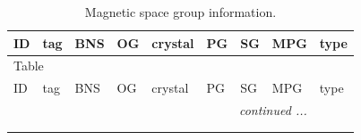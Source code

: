 \documentclass[fleqn,10pt]{jsarticle}
\begin{document}
\setcounter{MaxMatrixCols}{32}

\renewcommand{\tablename}{Table~}
\renewcommand{\figurename}{Figure~}
\begin{center}
\renewcommand{\arraystretch}{1.0}
\begin{longtable}{lllllllll}
\caption{Magnetic space group information.}
 \\
 \hline \hline
ID & tag & BNS & OG & crystal & PG & SG & MPG & type \\ \hline \endfirsthead

\multicolumn{8}{l}{\tablename\ \thetable{}} \\
 \hline \hline
ID & tag & BNS & OG & crystal & PG & SG & MPG & type \\ \hline \endhead

 \hline \hline
\multicolumn{8}{r}{\footnotesize\it continued ...} \\ \endfoot

 \hline \hline
\multicolumn{8}{r}{} \\ \endlastfoot


\end{longtable}
\end{center}
\end{document}
